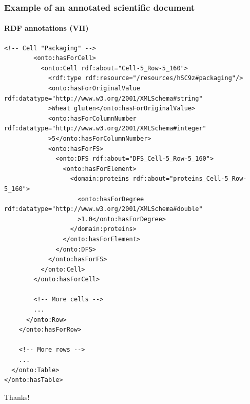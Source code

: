 \documentclass{beamer}
\begin{document}
\begin{frame}[fragile]
  \frametitle{Example of an annotated scientific document}
  \framesubtitle{RDF annotations (VII)}

  \begin{Verbatim}[fontsize=\tiny]
        <!-- Cell "Packaging" -->
        <onto:hasForCell>
          <onto:Cell rdf:about="Cell-5_Row-5_160">
            <rdf:type rdf:resource="/resources/hSC9z#packaging"/>
            <onto:hasForOriginalValue rdf:datatype="http://www.w3.org/2001/XMLSchema#string"
            >Wheat gluten</onto:hasForOriginalValue>
            <onto:hasForColumnNumber rdf:datatype="http://www.w3.org/2001/XMLSchema#integer"
            >5</onto:hasForColumnNumber>
            <onto:hasForFS>
              <onto:DFS rdf:about="DFS_Cell-5_Row-5_160">
                <onto:hasForElement>
                  <domain:proteins rdf:about="proteins_Cell-5_Row-5_160">
                    <onto:hasForDegree rdf:datatype="http://www.w3.org/2001/XMLSchema#double"
                    >1.0</onto:hasForDegree>
                  </domain:proteins>
                </onto:hasForElement>
              </onto:DFS>
            </onto:hasForFS>
          </onto:Cell>
        </onto:hasForCell>

        <!-- More cells -->
        ...
      </onto:Row>
    </onto:hasForRow>

    <!-- More rows -->
    ...
  </onto:Table>
</onto:hasTable>
  \end{Verbatim}
\end{frame}

\begin{frame}
  \begin{center}
    \Huge{Thanks!}
  \end{center}
\end{frame}
\end{document}
